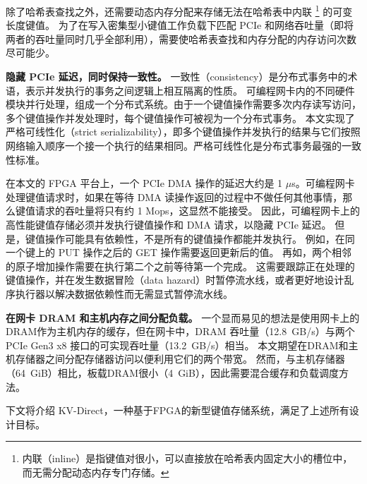 除了哈希表查找之外，还需要动态内存分配来存储无法在哈希表中内联 \footnote{内联（inline）是指键值对很小，可以直接放在哈希表内固定大小的槽位中，而无需分配动态内存专门存储。} 的可变长度键值。
为了在写入密集型小键值工作负载下匹配 PCIe 和网络吞吐量（即将两者的吞吐量同时几乎全部利用），需要使哈希表查找和内存分配的内存访问次数尽可能少。

\textbf {隐藏 PCIe 延迟，同时保持一致性。}
一致性（consistency）是分布式事务中的术语，表示并发执行的事务之间逻辑上相互隔离的性质。
可编程网卡内的不同硬件模块并行处理，组成一个分布式系统。由于一个键值操作需要多次内存读写访问，多个键值操作并发处理时，每个键值操作可被视为一个分布式事务。
本文实现了严格可线性化（strict serializability），即多个键值操作并发执行的结果与它们按照网络输入顺序一个接一个执行的结果相同。严格可线性化是分布式事务最强的一致性标准。

在本文的 FPGA 平台上，一个 PCIe DMA 操作的延迟大约是 1 $\mu$s。可编程网卡处理键值请求时，如果在等待 DMA 读操作返回的过程中不做任何其他事情，那么键值请求的吞吐量将只有约 1 Mops，这显然不能接受。
因此，可编程网卡上的高性能键值存储必须并发执行键值操作和 DMA 请求，以隐藏 PCIe 延迟。
但是，键值操作可能具有依赖性，不是所有的键值操作都能并发执行。
例如，在同一个键上的 PUT 操作之后的 GET 操作需要返回更新后的值。
再如，两个相邻的原子增加操作需要在执行第二个之前等待第一个完成。
这需要跟踪正在处理的键值操作，并在发生数据冒险（data hazard）时暂停流水线，或者更好地设计乱序执行器以解决数据依赖性而无需显式暂停流水线。


\textbf {在网卡 DRAM 和主机内存之间分配负载。}
一个显而易见的想法是使用网卡上的DRAM作为主机内存的缓存，但在网卡中，DRAM 吞吐量（12.8~GB/s）与两个 PCIe Gen3 x8 接口的可实现吞吐量（13.2~GB/s）相当。 
本文期望在DRAM和主机存储器之间分配存储器访问以便利用它们的两个带宽。
然而，与主机存储器（64~GiB）相比，板载DRAM很小（4~GiB），因此需要混合缓存和负载调度方法。

下文将介绍 KV-Direct，一种基于FPGA的新型键值存储系统，满足了上述所有设计目标。
